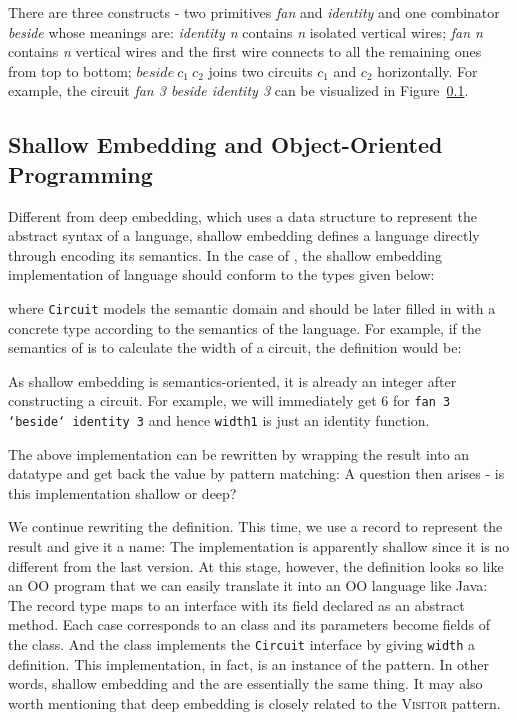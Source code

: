 There are three constructs - two primitives
\emph{fan} and \emph{identity} and one combinator \emph{beside} whose
meanings are: \emph{identity n} contains \emph{n} isolated vertical wires;
\emph{fan n} contains \emph{n} vertical wires and the first wire connects to
all the remaining ones from top to bottom; $beside\ c_1\ c_2$ joins two circuits
$c_1$ and $c_2$ horizontally.
For example, the circuit \emph{fan 3 beside identity 3} can be visualized in Figure~\ref{}.

\subsection{Shallow Embedding and Object-Oriented Programming}
Different from deep embedding, which uses a data structure to represent the
abstract syntax of a language, shallow embedding defines a language
directly through encoding its semantics. In the case of \dsl,
the shallow embedding implementation of language should conform to the types given below:

where \texttt{Circuit} models the semantic domain and should be later filled in with a
concrete type according to the semantics of the language.
For example, if the semantics of \dsl is to calculate the width of a
circuit, the definition would be:

As shallow embedding is semantics-oriented, it is already an integer after
constructing a circuit. For example, we will immediately get $6$ for
\texttt{fan 3 `beside` identity 3} and hence \texttt{width1} is just an identity function.

The above implementation can be rewritten by wrapping the result into an
datatype and get back the value by pattern matching:
A question then arises - is this implementation shallow or deep?

We continue rewriting the definition. This time, we use a record to represent
the result and give it a name:
The implementation is apparently shallow since it is no different from the last version.
At this stage, however, the definition looks so like an OO program that we can easily
translate it into an OO language like Java:
The record type maps to an interface with its field declared as an abstract method.
Each case corresponds to an class and its parameters become fields of the class.
And the class implements the \texttt{Circuit} interface by giving \texttt{width}
a definition. This implementation, in fact, is an instance of the \interp pattern.
In other words, shallow embedding and the \interp are essentially the same thing.
It may also worth mentioning that deep embedding is closely related to the
\textsc{Visitor} pattern.

